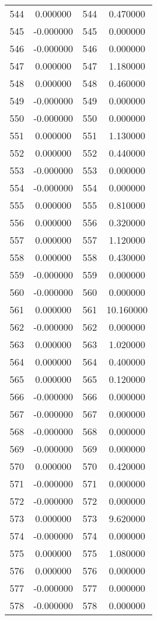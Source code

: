\documentclass[12pt]{article}
\begin{document}
\begin{longtable}{@{}cccc@{}}
544 & 0.000000 & 544 & 0.470000 \\
545 & -0.000000 & 545 & 0.000000 \\
546 & -0.000000 & 546 & 0.000000 \\
547 & 0.000000 & 547 & 1.180000 \\
548 & 0.000000 & 548 & 0.460000 \\
549 & -0.000000 & 549 & 0.000000 \\
550 & -0.000000 & 550 & 0.000000 \\
551 & 0.000000 & 551 & 1.130000 \\
552 & 0.000000 & 552 & 0.440000 \\
553 & -0.000000 & 553 & 0.000000 \\
554 & -0.000000 & 554 & 0.000000 \\
555 & 0.000000 & 555 & 0.810000 \\
556 & 0.000000 & 556 & 0.320000 \\
557 & 0.000000 & 557 & 1.120000 \\
558 & 0.000000 & 558 & 0.430000 \\
559 & -0.000000 & 559 & 0.000000 \\
560 & -0.000000 & 560 & 0.000000 \\
561 & 0.000000 & 561 & 10.160000 \\
562 & -0.000000 & 562 & 0.000000 \\
563 & 0.000000 & 563 & 1.020000 \\
564 & 0.000000 & 564 & 0.400000 \\
565 & 0.000000 & 565 & 0.120000 \\
566 & -0.000000 & 566 & 0.000000 \\
567 & -0.000000 & 567 & 0.000000 \\
568 & -0.000000 & 568 & 0.000000 \\
569 & -0.000000 & 569 & 0.000000 \\
570 & 0.000000 & 570 & 0.420000 \\
571 & -0.000000 & 571 & 0.000000 \\
572 & -0.000000 & 572 & 0.000000 \\
573 & 0.000000 & 573 & 9.620000 \\
574 & -0.000000 & 574 & 0.000000 \\
575 & 0.000000 & 575 & 1.080000 \\
576 & 0.000000 & 576 & 0.000000 \\
577 & -0.000000 & 577 & 0.000000 \\
578 & -0.000000 & 578 & 0.000000 \\

\end{longtable}
\end{document}
